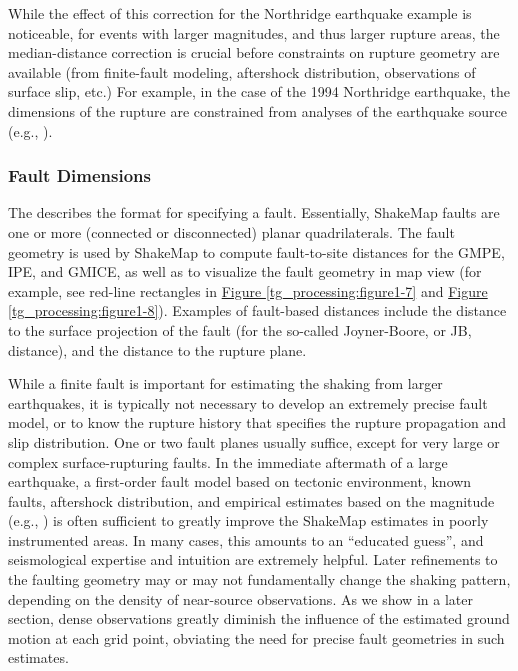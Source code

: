 \documentclass[letterpaper,10pt,english]{sphinxmanual}
\begin{document}
While the effect of this correction for the Northridge earthquake example is noticeable,
for events with larger magnitudes, and thus larger rupture areas, the median-distance
correction is crucial before
constraints on rupture geometry are available (from finite-fault modeling, aftershock
distribution, observations of surface slip, etc.) For example, in the case of the 1994
Northridge earthquake, the dimensions of the rupture are constrained from analyses of
the earthquake source (e.g., {\hyperref[references:wald1996]{}}).


\subsubsection{Fault Dimensions}
\label{tg_processing:fault-dimensions}\label{tg_processing:sec-fault-dimensions}
The {\hyperref[software_guide:sm35\string-software\string-guide]{}} describes the format for specifying a
fault. Essentially, ShakeMap
faults are one or more (connected or disconnected) planar quadrilaterals. The fault
geometry is used by ShakeMap to compute fault-to-site distances for the GMPE, IPE, and
GMICE, as well as to visualize the fault geometry in map view (for example, see red-line
rectangles in \hyperref[tg_processing:figure1-7]{Figure  \ref*{tg_processing:figure1-7}} and \hyperref[tg_processing:figure1-8]{Figure  \ref*{tg_processing:figure1-8}}). Examples of
fault-based distances include the distance to the surface projection of the
fault (for the so-called Joyner-Boore, or JB, distance), and the distance to the rupture plane.

While a finite fault is important for estimating the shaking from larger earthquakes, it is
typically not necessary to develop an extremely precise fault model, or to know the
rupture history that specifies the rupture propagation and slip distribution.
One or two fault planes usually suffice, except for very large or complex
surface-rupturing faults. In the immediate aftermath of a large earthquake, a first-order
fault model based on tectonic environment, known faults, aftershock distribution, and
empirical estimates based on the magnitude (e.g., {\hyperref[references:wells1994]{}}) is often
sufficient to greatly improve the ShakeMap estimates in poorly instrumented areas. In
many cases, this amounts to an ``educated guess”, and seismological expertise and
intuition are extremely helpful. Later refinements to the faulting geometry may or may
not fundamentally change the shaking pattern, depending on the density of near-source
observations. As we show in a later section, dense observations greatly diminish the
influence of the estimated ground motion at each grid point, obviating the need for precise
fault geometries in such estimates.
\end{document}
